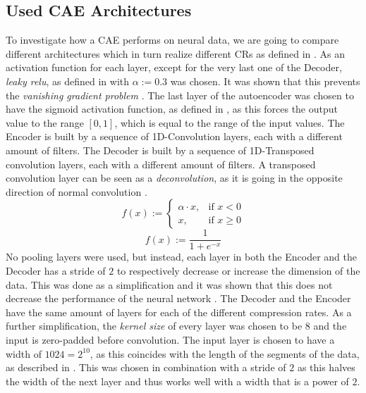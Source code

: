 \subsection{Used CAE Architectures} \label{sec:usedCaeArchitectures}
To investigate how a CAE performs on neural data, we are going to compare different architectures which in turn realize different CRs as defined in .
As an activation function for each layer, except for the very last one of the Decoder, \textit{leaky relu}, as defined in  with $\alpha := 0.3$ was chosen. 
It was shown that this prevents the \textit{vanishing gradient problem} \cite{agostinelli2014learning}.
The last layer of the autoencoder was chosen to have the sigmoid activation function, as defined in , as this forces the output value to the range $[0,1]$, which is equal to the range of the input values.
The Encoder is built by a sequence of 1D-Convolution layers, each with a different amount of filters.
The Decoder is built by a sequence of 1D-Transposed convolution layers, each with a different amount of filters.
A transposed convolution layer can be seen as a \textit{deconvolution}, as it is going in the opposite direction of normal convolution \cite{geron2017hands}.
\begin{equation}
	f(x) := \begin{cases}
		\alpha \cdot x, & \text{if $x < 0$} \\
		x, & \text{if $x \geq 0$}
	\end{cases}
	\label{eq:leakyRelu}
\end{equation}
\begin{equation}
	f(x) := \frac{1}{1+e^{-x}}
	\label{eq:sigmoid}
\end{equation}
No pooling layers were used, but instead, each layer in both the Encoder and the Decoder has a stride of $2$ to respectively decrease or increase the dimension of the data.
This was done as a simplification and it was shown that this does not decrease the performance of the neural network \cite{springenberg2014striving}.
The Decoder and the Encoder have the same amount of layers for each of the different compression rates.
As a further simplification, the \textit{kernel size} of every layer was chosen to be $8$ and the input is zero-padded before convolution.
The input layer is chosen to have a width of $1024 = 2^{10}$, as this coincides with the length of the segments of the data, as described in .
This was chosen in combination with a stride of $2$ as this halves the width of the next layer and thus works well with a width that is a power of $2$.
